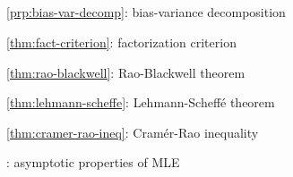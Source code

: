 \subsection*{}
\item \cref{prp:bias-var-decomp}: bias-variance decomposition
\item \cref{thm:fact-criterion}: factorization criterion
\item \cref{thm:rao-blackwell}: Rao-Blackwell theorem
\item \cref{thm:lehmann-scheffe}: Lehmann-Scheff\'{e} theorem
\item \cref{thm:cramer-rao-ineq}: Cram\'{e}r-Rao inequality
\item {}: asymptotic properties of MLE
